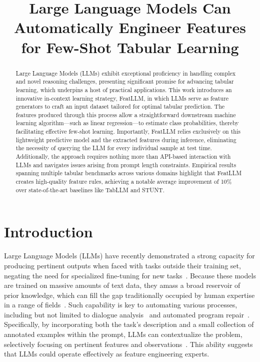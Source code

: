 \title{Large Language Models Can Automatically Engineer Features for Few-Shot Tabular Learning}

\begin{abstract}
Large Language Models (LLMs) exhibit exceptional proficiency in handling complex and novel reasoning challenges, presenting significant promise for advancing tabular learning, which underpins a host of practical applications. This work introduces an innovative in-context learning strategy, \textsf{FeatLLM}, in which LLMs serve as feature generators to craft an input dataset tailored for optimal tabular prediction. The features produced through this process allow a straightforward downstream machine learning algorithm—such as linear regression—to estimate class probabilities, thereby facilitating effective few-shot learning. Importantly, \textsf{FeatLLM} relies exclusively on this lightweight predictive model and the extracted features during inference, eliminating the necessity of querying the LLM for every individual sample at test time. Additionally, the approach requires nothing more than API-based interaction with LLMs and navigates issues arising from prompt length constraints. Empirical results spanning multiple tabular benchmarks across various domains highlight that \textsf{FeatLLM} creates high-quality feature rules, achieving a notable average improvement of 10\% over state-of-the-art baselines like TabLLM and STUNT.
\end{abstract}

\section{Introduction}
Large Language Models (LLMs) have recently demonstrated a strong capacity for producing pertinent outputs when faced with tasks outside their training set, negating the need for specialized fine-tuning for new tasks~\cite{creswell2022selection,imani2023mathprompter,taylor2022galactica}. Because these models are trained on massive amounts of text data, they amass a broad reservoir of prior knowledge, which can fill the gap traditionally occupied by human expertise in a range of fields~\cite{Genomes2021,singhal2023large,wilcox2003role}. Such capability is key to automating various processes, including but not limited to dialogue analysis~\cite{finch2023leveraging} and automated program repair~\cite{fan2023automated}. Specifically, by incorporating both the task's description and a small collection of annotated examples within the prompt, LLMs can contextualize the problem, selectively focusing on pertinent features and observations~\cite{brown2020language,zhao2023survey}. This ability suggests that LLMs could operate effectively as feature engineering experts. 


